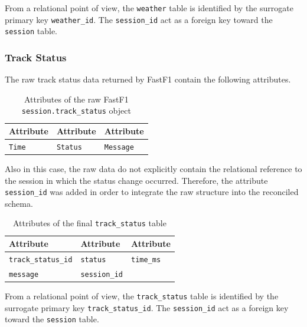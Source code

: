 \documentclass[12pt,a4paper]{article}
\begin{document}
	From a relational point of view, the \texttt{weather} table is identified by the surrogate primary key \texttt{weather\_id}.
	The \texttt{session\_id} act as a foreign key toward the \texttt{session} table.
	
	\subsubsection{Track Status}
	
	The raw track status data returned by FastF1 contain the following attributes.
	
	\begin{table}[H]
		\centering
		\caption{Attributes of the raw FastF1 \texttt{session.track\_status} object}
		\renewcommand{\arraystretch}{1.15}
		\begin{tabularx}{0.95\textwidth}{>{\raggedright\arraybackslash}X >{\raggedright\arraybackslash}X >{\raggedright\arraybackslash}X}
			\toprule
			\textbf{Attribute} & \textbf{Attribute} & \textbf{Attribute} \\
			\midrule
			\texttt{Time} & \texttt{Status} & \texttt{Message} \\
			\bottomrule
		\end{tabularx}
	\end{table}
	
	Also in this case, the raw data do not explicitly contain the relational reference to the session in which the status change occurred.
	Therefore, the attribute \texttt{session\_id} was added in order to integrate the raw structure into the reconciled schema.
	
	\begin{table}[H]
		\centering
		\caption{Attributes of the final \texttt{track\_status} table}
		\renewcommand{\arraystretch}{1.15}
		\begin{tabularx}{0.95\textwidth}{>{\raggedright\arraybackslash}X >{\raggedright\arraybackslash}X >{\raggedright\arraybackslash}X}
			\toprule
			\textbf{Attribute} & \textbf{Attribute} & \textbf{Attribute} \\
			\midrule
			\texttt{track\_status\_id}    & \texttt{status}        & \texttt{time\_ms} \\
			\texttt{message}        &  \texttt{session\_id} &  \\
			\bottomrule
		\end{tabularx}
	\end{table}
	
	From a relational point of view, the \texttt{track\_status} table is identified by the surrogate primary key \texttt{track\_status\_id}.
	The \texttt{session\_id} act as a foreign key toward the \texttt{session} table.
\end{document}
